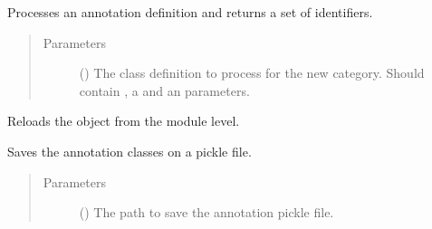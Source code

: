 \documentclass[letterpaper,10pt,english]{sphinxmanual}
\begin{document}
\begin{fulllineitems}
\begin{fulllineitems}
\begin{quote}
\begin{description}
\end{description}\end{quote}

\end{fulllineitems}


\begin{fulllineitems}
\label{\detokenize{reference:pypath.annot.CustomAnnotation.process_annot}}
Processes an annotation definition and returns a set of
identifiers.
\begin{quote}\begin{description}
\item[{Parameters}] \leavevmode
{} () \textendash{} The class definition to process for the new category. Should
contain , a  and an 
parameters.

\end{description}\end{quote}

\end{fulllineitems}


\begin{fulllineitems}
\label{\detokenize{reference:pypath.annot.CustomAnnotation.reload}}
Reloads the object from the module level.

\end{fulllineitems}


\begin{fulllineitems}
\label{\detokenize{reference:pypath.annot.CustomAnnotation.save_to_pickle}}
Saves the annotation classes on a pickle file.
\begin{quote}\begin{description}
\item[{Parameters}] \leavevmode
{} () \textendash{} The path to save the annotation pickle file.

\end{description}\end{quote}

\end{fulllineitems}


\end{fulllineitems}
\end{document}
